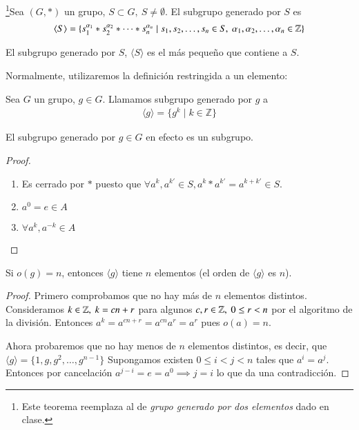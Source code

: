 \begin{dfn}
	\footnote{Este teorema reemplaza al de \textit{grupo generado por dos elementos} dado en clase.}Sea $(G, \ast)$ un grupo, $S \subset G,\ S \neq \emptyset$. El subgrupo generado por $S$ es
	\begin{align}
	\langle S \rangle = \{s_1^{\alpha_1} \ast s_2^{\alpha_2} \ast \dots \ast s_n^{\alpha_n} \mid s_1, s_2, \dots, s_n \in S,\ \alpha_1, \alpha_2, \dots, \alpha_n \in \mathbb{Z} \}
	\end{align}
\end{dfn}

\begin{pro}
	El subgrupo generado por $S$, $\langle S \rangle$ es el más pequeño que contiene a $S$.
\end{pro}


Normalmente, utilizaremos la definición restringida a un elemento:

\begin{dfn}
	\label{dfn:subgrupogenerado}
	Sea $G$ un grupo, $g \in G$. Llamamos subgrupo generado por $g$ a
	\begin{align}
		\langle g \rangle = \{g^k \mid k \in \mathbb{Z}\}
	\end{align}
\end{dfn}

\begin{pro}
	El subgrupo generado por $g \in G$ en efecto es un subgrupo.
\end{pro}

\begin{proof}$ $\newline
	\begin{enumerate}
		\item Es cerrado por $\ast$ puesto que $\forall a^k, a^{k'} \in S, a^k \ast a^{k'} = a^{k + k'} \in S$.
		\item $a^0 = e \in A$
		\item $\forall a^{k}, a^{-k} \in A$
	\end{enumerate}
\end{proof}

\begin{pro}
	Si $o(g) = n$, entonces $\langle g \rangle$ tiene $n$ elementos (el orden de $\langle g \rangle$ es $n$).
\end{pro}

\begin{proof}
	Primero comprobamos que no hay más de $n$ elementos distintos. Consideramos $k \in \Z,\ k = cn + r$ para algunos $c, r \in \Z,\ 0 \leq r < n$ por el algoritmo de la división. Entonces $a^k = a^{cn + r} = a^{cn} a^{r} = a^{r}$ pues $o(a) = n$.
	
	Ahora probaremos que no hay menos de $n$ elementos distintos, es decir, que $\langle g \rangle = \{1, g, g^2, \dots, g^{n-1}\}$ Supongamos existen $0 \leq i < j < n$ tales que $a^i = a^j$. Entonces por cancelación $a^{j - i} = e = a^0 \implies j = i$ lo que da una contradicción.
\end{proof}


